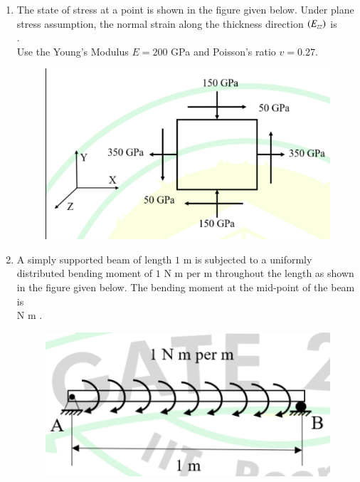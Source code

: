 \documentclass[journal]{IEEEtran}
\begin{document}
\begin{enumerate}[leftmargin=0pt]
\item
The state of stress at a point is shown in the figure given below. Under plane stress assumption, the normal strain along the thickness direction $\left(E_{zz}\right)$ is\\
\underline{\hspace{2cm}} .\\
Use the Young's Modulus $E = 200$ GPa and Poisson's ratio $v = 0.27$.
\begin{figure}[H]\includegraphics[width=0.5\columnwidth]{Figs/image - 2025-08-24T170617.692.png}\caption*{}\label{fig:q56}\end{figure}
\hfill{}

\item
A simply supported beam of length $1$ m is subjected to a uniformly distributed bending moment of $1$ N m per m throughout the length as shown in the figure given below. The bending moment at the mid-point of the beam is\\
\underline{\hspace{2cm}} N m .
\begin{figure}[H]\includegraphics[width=0.5\columnwidth]{Figs/image - 2025-08-24T170702.548.png}\caption*{}\label{fig:q57}\end{figure}
\hfill{}


\end{enumerate}
\end{document}
